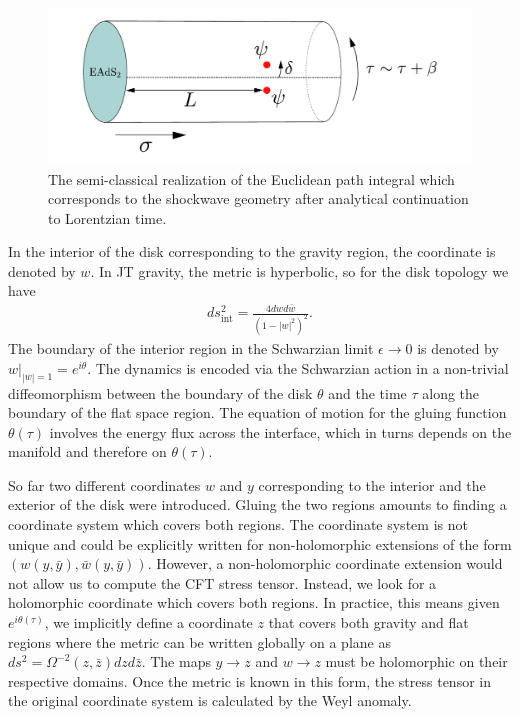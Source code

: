 \documentclass[12pt]{article}
\def\ba{\begin{eqnarray}}
\def\ea{\end{eqnarray}}
\numberwithin{equation}{section}
\def\ba{\begin{eqnarray}}
\def\ea{\end{eqnarray}}
\begin{document}
\begin{spacing}{1.1}
\begin{figure}
\centering 
\includegraphics[scale=0.5]{./figures/cylinder_euc.pdf}
\caption{The semi-classical realization of the Euclidean path integral which corresponds to the shockwave geometry after analytical continuation to Lorentzian time.   }\label{fig:cyl}
\end{figure}


 In the interior of the disk corresponding to the gravity region, the coordinate is denoted by $w$. In JT gravity, the metric is hyperbolic, so for the disk topology we have
 \ba\label{metinwplane}
ds_{\text{int}}^2= \frac{4 dw d\bar{w}}{ (1-|w|^2)^2}.
\ea
 The boundary of the interior region in the Schwarzian limit $\epsilon \to 0$ is denoted by $%
w|_{|w|=1} = e^{ i\theta}$.  The dynamics is encoded via the Schwarzian action in a non-trivial diffeomorphism between the boundary of the disk $\theta$ and the time $ \tau$ along the boundary of the flat space region. The equation of motion for the gluing function $\theta(\tau)$ involves the energy flux across the interface, which in turns depends on the manifold and therefore on $\theta(\tau)$. 



So far two different coordinates $w$ and $y$ corresponding to the interior and the exterior of the disk were introduced.  Gluing the two regions amounts to finding a coordinate system which covers both regions. The coordinate system is not unique and could be explicitly written for non-holomorphic extensions of the form $(w(y, \bar{y}) ,\bar{w}(y, \bar{y}))$.  However, a non-holomorphic coordinate extension would not allow us to compute the CFT stress tensor. Instead, we look for a holomorphic coordinate which covers both regions.  In practice, this means given $e^{i \theta (\tau)}$, we implicitly define a coordinate $z$ that covers both gravity and flat regions where the metric can be written globally on a plane as $ds^2 = \Omega^{-2} (z,\bar{z}) dz d\bar{z}$. The maps $y \to z$ and $w \to z$ must be holomorphic on their respective domains. Once the metric is known in this form, the stress tensor in the original coordinate system is calculated by the Weyl anomaly.


\end{spacing}
\end{document}
